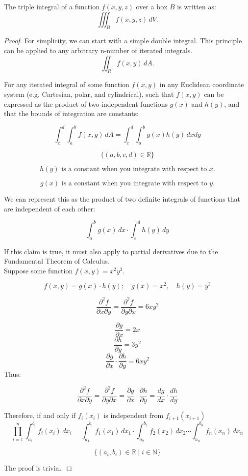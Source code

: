 \documentclass{article}
\begin{document}
\noindent The triple integral of a function \( f(x, y, z) \) over a box \( B \) is written as:
\[
\iiint_B f(x, y, z) \, dV.
\]

\begin{proof}

\noindent For simplicity, we can start with a simple double integral. This principle can be applied to any arbitrary n-number of iterated integrals.
\[
\iint_Rf(x,y) \, dA.
\]

\noindent For any iterated integral of some function $f(x,y)$ in any Euclidean coordinate system (e.g. Cartesian, polar, and cylindrical), such that $f(x,y)$ can be expressed as the product of two independent functions $g(x)$ and $h(y)$, and that the bounds of integration are constants:

\[
\int_{c}^{d} \int_{a}^{b} f(x, y) \, dA = \int_{c}^{d} \int_{a}^{b} g(x)h(y) \,dxdy
\]

\[
\{(a, b, c, d) \in \mathbb{R}\}
\]

\[
h(y) \text{ is a constant when you integrate with respect to } x.
\]

\[
g(x) \text{ is a constant when you integrate with respect to } y.
\]

\noindent We can represent this as the product of two definite integrals of functions that are independent of each other:

\[
\int_{a}^{b}g(x) \,dx \cdot \int_{c}^{d}h(y) \,dy
\]

\noindent If this claim is true, it must also apply to partial derivatives due to the Fundamental Theorem of Calculus.\\

\noindent Suppose some function $f(x, y) = x^2 y^3$.

\[
f(x, y) = g(x) \cdot h(y); \quad g(x) = x^2, \quad h(y) = y^3
\]

\[
\frac{\partial^{2} f}{\partial x \partial y} = \frac{\partial^{2}f}{\partial y \partial x} = 6xy^{2}
\]

\[\frac{\partial g}{\partial x} = 2x\]
\[\frac{\partial h}{\partial y} = 3y^{2}\]
\[\frac{\partial g}{\partial x} \cdot \frac{\partial h}{\partial y} = 6xy^{2}\]
Thus:

\[
\frac{\partial^2 f}{\partial x \partial y} = \frac{\partial^2 f}{\partial y \partial x} = \frac{\partial g}{\partial x} \cdot \frac{\partial h}{\partial y} = \frac{dg}{dx} \cdot \frac{dh}{dy}
\]

\noindent Therefore, if and only if $f_i(x_i)$ is independent from $f_{i+1}(x_{i+1})$
\[
\prod_{i=1}^n \int_{a_i}^{b_i} f_i(x_i) \, dx_i = \int_{a_1}^{b_1} f_1(x_1) \, dx_1 \cdot \int_{a_2}^{b_2} f_2(x_2) \, dx_2 \cdots \int_{a_n}^{b_n} f_n(x_n) \, dx_n
\]

\[
\{(a_i, b_i) \in \mathbb{R}\mid i \in \mathbb{N} \}
\]

\noindent The proof is trivial.

\end{proof}
\end{document}
